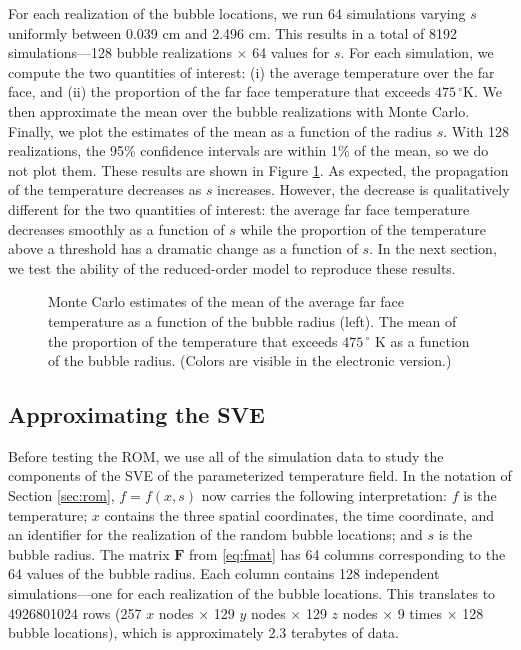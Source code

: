 \documentclass[final]{siamltex}
\providecommand{\mat}[1]{\boldsymbol{#1}}
\providecommand{\mF}{\ensuremath{\mat{F}}}
\begin{document}
For each realization of the bubble locations, we run 64 simulations
varying $s$ uniformly between 0.039 cm and 2.496 cm. This results in a
total of 8192 simulations---128 bubble realizations $\times$ 64 values
for $s$. For each simulation, we compute the two quantities of
interest: (i) the average temperature over the far face, and (ii) the
proportion of the far face temperature that exceeds
$475\,^{\circ}\mathrm{K}$. We then approximate the mean over the
bubble realizations with Monte Carlo. Finally, we plot the estimates
of the mean as a function of the radius $s$. With 128
realizations, the 95\% confidence intervals are within 1\% of the
mean, so we do not plot them. These results are shown in Figure
\ref{fig:uq}. As expected, the propagation of the temperature
decreases as $s$ increases. However, the decrease is qualitatively
different for the two quantities of interest: the average far face
temperature decreases smoothly as a function of $s$ while the
proportion of the temperature above a threshold has a dramatic change
as a function of $s$. In the next section, we test the ability of the
reduced-order model to reproduce these results.

\begin{figure}[t]
\centering
{}\;
\caption{Monte Carlo estimates of the mean of the average far face
  temperature as a function of the bubble radius (left). The mean of
  the proportion of the temperature that exceeds $475\,^{\circ}$ K as
  a function of the bubble radius. (Colors are visible in the
  electronic version.) }
\label{fig:uq}
\end{figure} 

\subsection{Approximating the SVE}
Before testing the ROM, we use all of the simulation data to study the
components of the SVE of the parameterized temperature field. In the
notation of Section \ref{sec:rom}, $f=f(x,s)$ now carries the
following interpretation: $f$ is the temperature; $x$ contains the
three spatial coordinates, the time coordinate, and an identifier for
the realization of the random bubble locations; and $s$ is the bubble
radius. The matrix $\mF$ from \eqref{eq:fmat} has 64 columns
corresponding to the 64 values of the bubble radius.  Each column
contains 128 independent simulations---one for each realization of the
bubble locations. This translates to 4926801024 rows (257 $x$ nodes
$\times$ 129 $y$ nodes $\times$ 129 $z$ nodes $\times$ 9 times
$\times$ 128 bubble locations), which is approximately 2.3 terabytes
of data.
\end{document}
